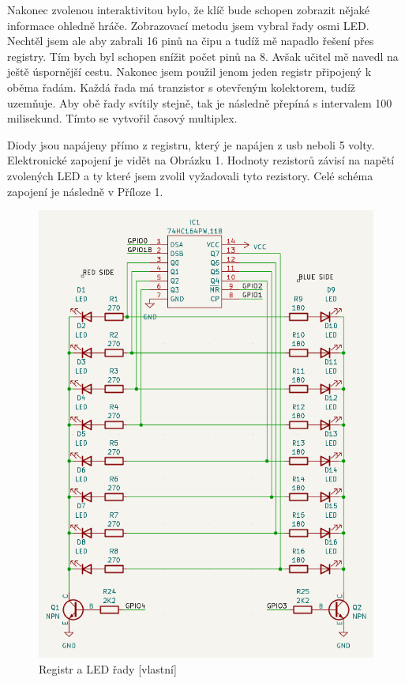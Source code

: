 \documentclass[12pt,a4paper]{article}
\begin{document}
Nakonec zvolenou interaktivitou bylo, že klíč bude schopen zobrazit nějaké informace ohledně hráče. Zobrazovací metodu jsem vybral řady osmi LED. Nechtěl jsem ale aby zabrali 16 pinů na čipu a tudíž mě napadlo řešení přes registry. Tím bych byl schopen snížit počet pinů na 8. Avšak učitel mě navedl na ještě úspornější cestu. Nakonec jsem použil jenom jeden registr připojený k oběma řadám. Každá řada má tranzistor s otevřeným kolektorem, tudíž uzemňuje. Aby obě řady svítily stejně, tak je následně přepíná s intervalem 100 milisekund. Tímto se vytvořil časový multiplex.

Diody jsou napájeny přímo z registru, který je napájen z usb neboli 5 volty. Elektronické zapojení je vidět na Obrázku 1. Hodnoty rezistorů závisí na napětí zvolených LED a ty které jsem zvolil vyžadovali tyto rezistory. Celé schéma zapojení je následně v Příloze 1.

\begin{figure}[H]
    \centering
    \includegraphics[width=\textwidth-3 cm]{pictures/register_LED.png}
    \caption{Registr a LED řady [vlastní]}
\end{figure}
\end{document}
